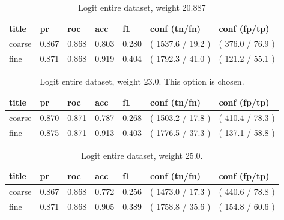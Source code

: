 \documentclass[ms]{nuthesis}
\begin{document}
\FloatBarrier
\begin{table}[H]
\centering
\caption{Logit entire dataset, weight 20.887}
\label{tab:LogRegAllOrig-Wt20p887}
\begin{tabular}{|l||l||l||l||l||l||l|}\toprule
title & pr & roc & acc & f1 & conf (tn/fn) & conf (fp/tp) \\ \midrule
coarse & 0.867 & 0.868 & 0.803 & 0.280 & ( 1537.6 / 19.2 ) & ( 376.0 / 76.9 ) \\
fine & 0.871 & 0.868 & 0.919 & 0.404 & ( 1792.3 / 41.0 ) & ( 121.2 / 55.1 ) \\ \bottomrule
\end{tabular}
\end{table}
\FloatBarrier

\FloatBarrier
\begin{table}[H]
\centering
\caption{Logit entire dataset, weight 23.0. This option is chosen.}
\label{tab:LogRegAll-Wt23}
\begin{tabular}{|l||l||l||l||l||l||l|}\toprule
title & pr & roc & acc & f1 & conf (tn/fn) & conf (fp/tp) \\ \midrule
coarse & 0.870 & 0.871 & 0.787 & 0.268 & ( 1503.2 / 17.8 ) & ( 410.4 / 78.3 ) \\
fine & 0.875 & 0.871 & 0.913 & 0.403 & ( 1776.5 / 37.3 ) & ( 137.1 / 58.8 ) \\ \bottomrule
\end{tabular}
\end{table}
\FloatBarrier

\FloatBarrier
\begin{table}[H]
\centering
\caption{Logit entire dataset, weight 25.0.}
\label{tab:LogRegAll-Wt25}
\begin{tabular}{|l||l||l||l||l||l||l|}\toprule
title & pr & roc & acc & f1 & conf (tn/fn) & conf (fp/tp) \\ \midrule
coarse & 0.867 & 0.868 & 0.772 & 0.256 & ( 1473.0 / 17.3 ) & ( 440.6 / 78.8 ) \\
fine & 0.871 & 0.868 & 0.905 & 0.389 & ( 1758.8 / 35.6 ) & ( 154.8 / 60.6 ) \\ \bottomrule
\end{tabular}
\end{table}
\FloatBarrier
\end{document}
